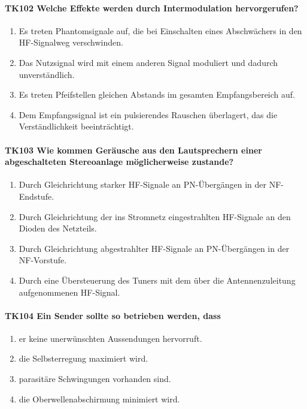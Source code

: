 \documentclass[8pt]{article}
\begin{document}
\paragraph*{TK102 Welche Effekte werden durch Intermodulation hervorgerufen?}
\begin{enumerate}[nolistsep,label=\Alph*]
\item Es treten Phantomsignale auf, die bei Einschalten eines Abschwächers in den HF-Signalweg verschwinden.
\item Das Nutzsignal wird mit einem anderen Signal moduliert und dadurch unverständlich.
\item Es treten Pfeifstellen gleichen Abstands im gesamten Empfangsbereich auf.
\item Dem Empfangssignal ist ein pulsierendes Rauschen überlagert, das die Verständlichkeit beeinträchtigt.
\end{enumerate}

\paragraph*{TK103 Wie kommen Geräusche aus den Lautsprechern einer abgeschalteten Stereoanlage möglicherweise zustande?}
\begin{enumerate}[nolistsep,label=\Alph*]
\item Durch Gleichrichtung starker HF-Signale an PN-Übergängen in der NF-Endstufe.
\item Durch Gleichrichtung der ins Stromnetz eingestrahlten HF-Signale an den Dioden des Netzteils.
\item Durch Gleichrichtung abgestrahlter HF-Signale an PN-Übergängen in der NF-Vorstufe.
\item Durch eine Übersteuerung des Tuners mit dem über die Antennenzuleitung aufgenommenen HF-Signal.
\end{enumerate}

\paragraph*{TK104 Ein Sender sollte so betrieben werden, dass} 
\begin{enumerate}[nolistsep,label=\Alph*]
\item er keine unerwünschten Aussendungen hervorruft.
\item die Selbsterregung maximiert wird.
\item parasitäre Schwingungen vorhanden sind.
\item die Oberwellenabschirmung minimiert wird.
\end{enumerate}
\end{document}
